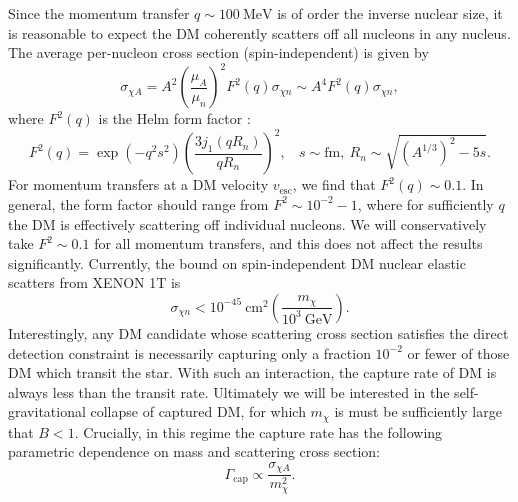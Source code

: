 \documentclass[preprintnumbers,amsmath,amssymb,prd,superscriptaddress]{revtex4}
\newcommand{\Eboom}{\mathcal{E}_\text{boom}}
\newcommand{\GeV}{\text{GeV}}
\newcommand{\cm}{\text{cm}}
\def\r{\right)}
\def\l{\left(}
\begin{document}
Since the momentum transfer $q \sim 100 ~\text{MeV}$ is of order the inverse nuclear size, it is reasonable to expect the DM coherently scatters off all nucleons in any nucleus. 
The average per-nucleon cross section (spin-independent) is given by
\begin{equation}
\sigma_{\chi A} = A^2 \l \frac{\mu_{A}}{\mu_{n}}\r^2 F^2(q) \sigma_{\chi n} \sim A^4 F^2(q) \sigma_{\chi n},
\end{equation}
where $F^2(q)$ is the Helm form factor \cite{LUX thesis}:
\begin{equation}
F^2(q) = \exp (-q^2 s^2) \left(\frac{3 j_1(q R_n)}{q R_n}\right)^2, ~~~~ s \sim \text{fm}, ~ R_n \sim \sqrt{(A^{1/3})^2 - 5s}. 
\end{equation}
For momentum transfers at a DM velocity $v_\text{esc}$, we find that $F^2(q) \sim 0.1$. 
In general, the form factor should range from $F^2 \sim 10^{-2} - 1$, where for sufficiently $q$ the DM is effectively scattering off individual nucleons. 
We will conservatively take $F^2 \sim 0.1$ for all momentum transfers, and this does not affect the results significantly. 
Currently, the bound on spin-independent DM nuclear elastic scatters from XENON 1T \cite{Xenon} is
\begin{equation}
\label{eq:xenon}
\sigma_{\chi n} < 10^{-45} ~\text{cm}^2 \l \frac{m_\chi}{10^3 ~\GeV} \r.
\end{equation}
Interestingly, any DM candidate whose scattering cross section satisfies the direct detection constraint is necessarily capturing only a fraction $10^{-2}$ or fewer of those DM which transit the star.
With such an interaction, the capture rate of DM is always less than the transit rate. 
Ultimately we will be interested in the self-gravitational collapse of captured DM, for which $m_\chi$ is must be sufficiently large that $B < 1$.
Crucially, in this regime the capture rate has the following parametric dependence on mass and scattering cross section:
\begin{equation}
\Gamma_\text{cap} \propto \frac{\sigma_{\chi A}}{m_\chi^2}. 
\end{equation}
\end{document}
